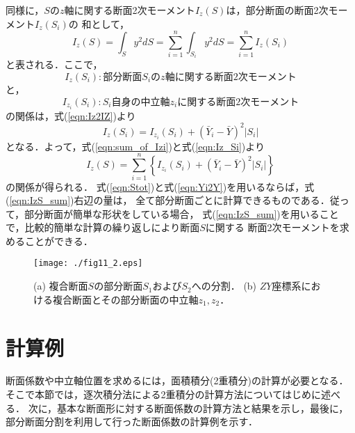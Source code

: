 \documentclass[10pt,a4j]{jarticle}
\begin{document}
同様に，$S$の$z$軸に関する断面2次モーメント$I_z(S)$は，部分断面の断面2次モーメント$I_z(S_i)$の
和として，
\begin{equation}
	I_z(S)=\int_S y^2 dS=\sum_{i=1}^n\int_{S_i} y^2dS=\sum_{i=1}^n I_z(S_i)
	\label{eqn:sum_of_Izi}
\end{equation}
と表される．ここで，
\[
	I_z(S_i): 部分断面S_iのz軸に関する断面2次モーメント
\]
と，
\[
	I_{z_i}(S_i): S_i自身の中立軸z_iに関する断面2次モーメント
\]
の関係は，式(\ref{eqn:Iz2IZ})より
\begin{equation}
	I_z(S_i)=I_{z_i}(S_i)+\left( \bar Y_i-\bar{Y} \right)^2 \left|S_i\right|
	\label{eqn:Iz_Si}
\end{equation}
となる．よって，式(\ref{eqn:sum_of_Izi})と式(\ref{eqn:Iz_Si})より
\begin{equation}
	I_z(S)=
	\sum_{i=1}^n\left\{
		I_{z_i}(S_i)+\left( \bar Y_i-\bar{Y} \right)^2 \left|S_i\right|
	\right\}
	\label{eqn:IzS_sum}
\end{equation}
の関係が得られる．
式(\ref{eqn:Stot})と式(\ref{eqn:Yi2Y})を用いるならば，式(\ref{eqn:IzS_sum})右辺の量は，
全て部分断面ごとに計算できるものである．従って，部分断面が簡単な形状をしている場合，
式(\ref{eqn:IzS_sum})を用いることで，比較的簡単な計算の繰り返しにより断面$S$に関する
断面2次モーメントを求めることができる．
\begin{figure}[h]
	\begin{center}
	\texttt{[image: ./fig11\_2.eps]} 
	\end{center}
	\caption{
		(a) 複合断面$S$の部分断面$S_1$および$S_2$への分割．
		(b) $ZY$座標系における複合断面とその部分断面の中立軸$z_1,z_2$．
	} 
	\label{fig:fig11_2}
\end{figure}
\section{計算例}
断面係数や中立軸位置を求めるには，面積積分(2重積分)の計算が必要となる．
そこで本節では，逐次積分法による2重積分の計算方法についてはじめに述べる．
次に，基本な断面形に対する断面係数の計算方法と結果を示し，最後に，
部分断面分割を利用して行った断面係数の計算例を示す．
\end{document}
